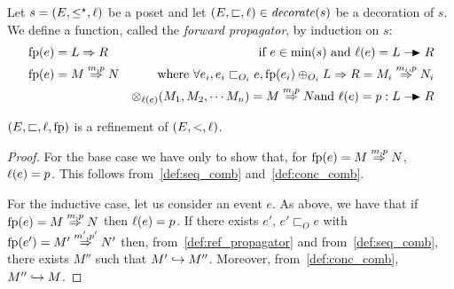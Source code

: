 \begin{definition}
  \label{def:ref_propagator}
  Let $s=(E,\leq^{\star},\ell)$ be a poset and let $(E,\sqsubset,\ell)\in \mathit{decorate}(s)$ be a decoration of $s$.
  We define a function, called the \emph{forward propagator}, by induction on $s$:
  \begin{align*}
    &\fp(e) = L\Rightarrow R&\text{ if }e\in\text{min}(s)\text{ and }\labl(e) = L\action R\\
    &\fp(e) = M\overset{m,p}{\Rightarrow} N&\text{ where }\forall e_i, e_i\sqsubset_{O_i}e,
    \fp(e_i)\oplus_{O_i}L\Rightarrow R= M_i\overset{m_i,p}{\Rightarrow} N_i\\
    &&\otimes_{\labl(e)}(M_1, M_2, \cdots M_n) = M \overset{m,p}{\Rightarrow} N
    \text{and }\labl(e) = p:L\action R\\
  \end{align*}
\end{definition}

\begin{lemma}
  $(E,\sqsubset,\ell,\operatorname{fp})$ is a refinement of $(E,<,\ell)$.
\end{lemma}
\begin{proof}
  For the base case we have only to show that, for $\operatorname{fp}(e) = M\overset{m,p}{\Rightarrow} N$, $\ell(e)=p$. This follows from~\autoref{def:seq_comb} and~\autoref{def:conc_comb}.

  For the inductive case, let us consider an event $e$. As above, we have that if $\operatorname{fp}(e) = M\overset{m,p}{\Rightarrow} N$ then $\ell(e)=p$. If there exists $e'$, $e'\sqsubset_O e$ with $\operatorname{fp}(e')= M'\overset{m',p'}{\Rightarrow} N'$ then, from~\autoref{def:ref_propagator} and from~\autoref{def:seq_comb}, there exists $M''$ such that $M'\hookrightarrow M''$. Moreover, from~\autoref{def:conc_comb}, $M''\hookrightarrow M$.
\end{proof}

